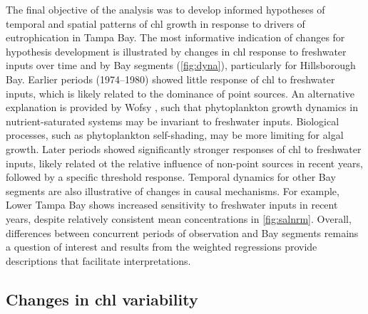 \documentclass{svjour3}\usepackage[]{graphicx}\usepackage[]{color}
\begin{document}
The final objective of the analysis was to develop informed hypotheses of temporal and spatial patterns of \ac{chl} growth in response to drivers of eutrophication in Tampa Bay.  The most informative indication of changes for hypothesis development is illustrated by changes in \ac{chl} response to freshwater inputs over time and by Bay segments (\cref{fig:dyna}), particularly for Hillsborough Bay.  Earlier periods (1974--1980) showed little response of \ac{chl} to freshwater inputs, which is likely related to the dominance of point sources.  An alternative explanation is provided by Wofsy \cite{Wofsy83}, such that phytoplankton growth dynamics in nutrient-saturated systems may be invariant to freshwater inputs.  Biological processes, such as phytoplankton self-shading, may be more limiting for algal growth.  Later periods showed significantly stronger responses of \ac{chl} to freshwater inputs, likely related ot the relative influence of non-point sources in recent years, followed by a specific threshold response. Temporal dynamics for other Bay segments are also illustrative of changes in causal mechanisms.  For example, Lower Tampa Bay shows increased sensitivity to freshwater inputs in recent years, despite relatively consistent mean concentrations in \cref{fig:salnrm}.  Overall, differences between concurrent periods of observation and Bay segments remains a question of interest and results from the weighted regressions provide descriptions that facilitate interpretations.

\subsection{Changes in \ac{chl} variability}
\end{document}
